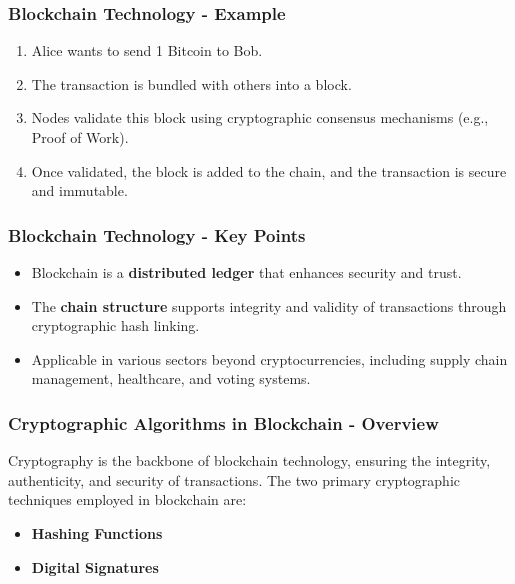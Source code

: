 \documentclass{beamer}
\begin{document}
\begin{frame}[fragile]
    \frametitle{Blockchain Technology - Example}
    \begin{enumerate}
        \item Alice wants to send 1 Bitcoin to Bob.
        \item The transaction is bundled with others into a block.
        \item Nodes validate this block using cryptographic consensus mechanisms (e.g., Proof of Work).
        \item Once validated, the block is added to the chain, and the transaction is secure and immutable.
    \end{enumerate}
\end{frame}

\begin{frame}[fragile]
    \frametitle{Blockchain Technology - Key Points}
    \begin{itemize}
        \item Blockchain is a \textbf{distributed ledger} that enhances security and trust.
        \item The \textbf{chain structure} supports integrity and validity of transactions through cryptographic hash linking.
        \item Applicable in various sectors beyond cryptocurrencies, including supply chain management, healthcare, and voting systems.
    \end{itemize}
\end{frame}

\begin{frame}[fragile]
    \frametitle{Cryptographic Algorithms in Blockchain - Overview}
    Cryptography is the backbone of blockchain technology, ensuring the integrity, authenticity, and security of transactions. The two primary cryptographic techniques employed in blockchain are:
    \begin{itemize}
        \item \textbf{Hashing Functions}
        \item \textbf{Digital Signatures}
    \end{itemize}
\end{frame}
\end{document}
